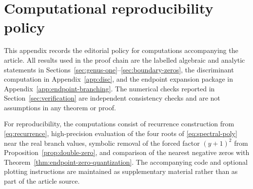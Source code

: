 \section{Computational reproducibility policy}\label{app:pseudocode}

This appendix records the editorial policy for computations accompanying the article.
All results used in the proof chain are the labelled algebraic and analytic statements in Sections~\ref{sec:genus-one}--\ref{sec:boundary-zeros}, the discriminant computation in Appendix~\ref{app:disc}, and the endpoint expansion package in Appendix~\ref{app:endpoint-branching}.
The numerical checks reported in Section~\ref{sec:verification} are independent consistency checks and are not assumptions in any theorem or proof.

For reproducibility, the computations consist of recurrence construction from \eqref{eq:recurrence}, high-precision evaluation of the four roots of \eqref{eq:spectral-poly} near the real branch values, symbolic removal of the forced factor \((y+1)^2\) from Proposition~\ref{prop:double-zero}, and comparison of the nearest negative zeros with Theorem~\ref{thm:endpoint-zero-quantization}.
The accompanying code and optional plotting instructions are maintained as supplementary material rather than as part of the article source.

